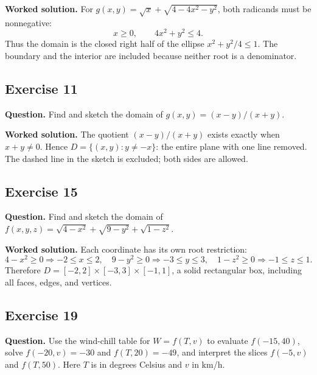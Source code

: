 \documentclass[11pt]{article}
\newcommand{\ex}[1]{\Needspace{8\baselineskip}\subsection*{Exercise #1}}
\newcommand{\ans}[1]{\boxed{#1}}
\begin{document}
\textbf{Worked solution.}
For $g(x,y)=\sqrt{x}+\sqrt{4-4x^2-y^2}$, both radicands must be nonnegative:
\[x\ge0,\qquad4x^2+y^2\le4.\]
Thus the domain is the closed right half of the ellipse $x^2+y^2/4\le1$. The boundary and the interior are included because neither root is a denominator.
\begin{center}\end{center}
\ex{11}
\textbf{Question.} Find and sketch the domain of $g(x,y)=(x-y)/(x+y)$.

\textbf{Worked solution.}
The quotient $(x-y)/(x+y)$ exists exactly when $x+y\ne0$. Hence $\ans{D=\{(x,y):y\ne-x\}}$: the entire plane with one line removed. The dashed line in the sketch is excluded; both sides are allowed.
\begin{center}\end{center}
\ex{15}
\textbf{Question.} Find and sketch the domain of $f(x,y,z)=\sqrt{4-x^2}+\sqrt{9-y^2}+\sqrt{1-z^2}$.

\textbf{Worked solution.}
Each coordinate has its own root restriction:
\[4-x^2\ge0\Rightarrow-2\le x\le2,\quad9-y^2\ge0\Rightarrow-3\le y\le3,\quad1-z^2\ge0\Rightarrow-1\le z\le1.\]
Therefore $\ans{D=[-2,2]\times[-3,3]\times[-1,1]}$, a solid rectangular box, including all faces, edges, and vertices.
\begin{center}\end{center}
\ex{19}
\textbf{Question.} Use the wind-chill table for $W=f(T,v)$ to evaluate $f(-15,40)$, solve $f(-20,v)=-30$ and $f(T,20)=-49$, and interpret the slices $f(-5,v)$ and $f(T,50)$. Here $T$ is in degrees Celsius and $v$ in km/h.
\end{document}
